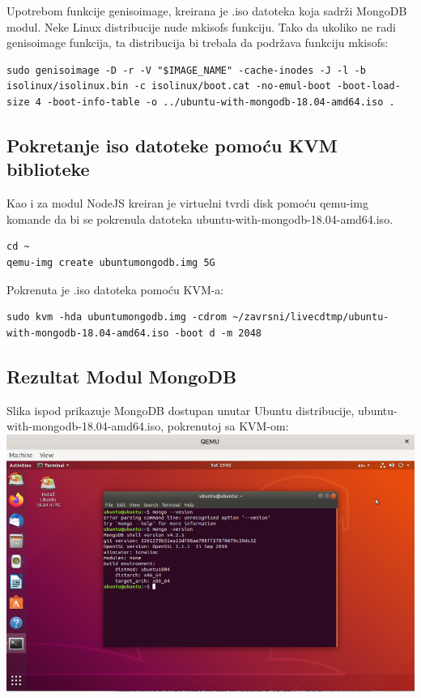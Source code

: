 \documentclass[12pt,vi]{mitthesis}
\begin{document}
\noindent
Upotrebom funkcije genisoimage, kreirana je .iso datoteka koja sadrži MongoDB modul. Neke Linux distribucije nude mkisofs funkciju. Tako da ukoliko ne radi genisoimage funkcija, ta distribucija bi trebala da podržava funkciju mkisofs:
\begin{lstlisting}[style=BashInputStyle]
sudo genisoimage -D -r -V "$IMAGE_NAME" -cache-inodes -J -l -b isolinux/isolinux.bin -c isolinux/boot.cat -no-emul-boot -boot-load-size 4 -boot-info-table -o ../ubuntu-with-mongodb-18.04-amd64.iso .
\end{lstlisting}

\subsection*{Pokretanje iso datoteke pomoću KVM biblioteke}
\indent
Kao i za modul NodeJS kreiran je virtuelni tvrdi disk pomoću qemu-img komande da bi se pokrenula datoteka ubuntu-with-mongodb-18.04-amd64.iso.
\begin{lstlisting}[style=BashInputStyle]
cd ~
qemu-img create ubuntumongodb.img 5G
\end{lstlisting}

\noindent 
Pokrenuta je .iso datoteka pomoću KVM-a:
\begin{lstlisting}[style=BashInputStyle]
sudo kvm -hda ubuntumongodb.img -cdrom ~/zavrsni/livecdtmp/ubuntu-with-mongodb-18.04-amd64.iso -boot d -m 2048
\end{lstlisting}

\subsection*{Rezultat Modul MongoDB}
\indent
Slika ispod prikazuje MongoDB dostupan unutar Ubuntu distribucije, ubuntu-with-mongodb-18.04-amd64.iso, pokrenutoj sa KVM-om:\\
\noindent
\includegraphics[width=\linewidth]{images/mongoLive.png} 
\newpage
\end{document}
